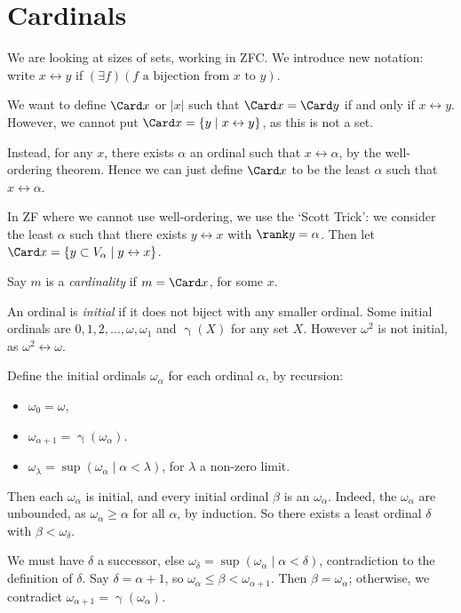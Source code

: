 \documentclass[12pt]{article}
\begin{document}
\newpage

\section{Cardinals}
\label{sec:cardinals}

We are looking at sizes of sets, working in ZFC. We introduce new notation: write $x \leftrightarrow y$ if $(\exists f)(f \text{ a bijection from } x \text { to } y)$.

We want to define $\Card x$ or $|x|$ such that $\Card x = \Card y$ if and only if $x \leftrightarrow y$. However, we cannot put $\Card x = \{y \mid x \leftrightarrow y\}$, as this is not a set.

Instead, for any $x$, there exists $\alpha$ an ordinal such that $x \leftrightarrow \alpha$, by the well-ordering theorem. Hence we can just define $\Card x$ to be the least $\alpha$ such that $x \leftrightarrow \alpha$.

In ZF where we cannot use well-ordering, we use the `Scott Trick': we consider the least $\alpha$ such that there exists $y \leftrightarrow x$ with $\rank y = \alpha$. Then let $\Card x = \{y \subset V_{\alpha} \mid y \leftrightarrow x\}$.

Say $m$ is a \emph{cardinality} if $m = \Card x$, for some $x$.

An ordinal is \emph{initial} if it does not biject with any smaller ordinal. Some initial ordinals are $0, 1, 2, \ldots, \omega, \omega_1$ and $\upgamma(X)$ for any set $X$. However $\omega^2$ is not initial, as $\omega^2 \leftrightarrow \omega$.

Define the initial ordinals $\omega_\alpha$ for each ordinal $\alpha$, by recursion:
\begin{itemize}
	\item $\omega_0 = \omega$,
	\item $\omega_{\alpha + 1} = \upgamma(\omega_\alpha)$.
		\item $\omega_\lambda = \sup(\omega_\alpha \mid \alpha < \lambda)$, for $\lambda$ a non-zero limit.
\end{itemize}

Then each $\omega_\alpha$ is initial, and every initial ordinal $\beta$ is an $\omega_\alpha$. Indeed, the $\omega_\alpha$ are unbounded, as $\omega_\alpha \ge \alpha$ for all $\alpha$, by induction. So there exists a least ordinal $\delta$ with $\beta < \omega_\delta$.

We must have $\delta$ a successor, else $\omega_\delta = \sup(\omega_\alpha \mid \alpha < \delta)$, contradiction to the definition of $\delta$. Say $\delta = \alpha + 1$, so $\omega_\alpha \le \beta < \omega_{\alpha + 1}$. Then $\beta = \omega_\alpha$; otherwise, we contradict $\omega_{\alpha+1} = \upgamma(\omega_\alpha)$.
\end{document}
